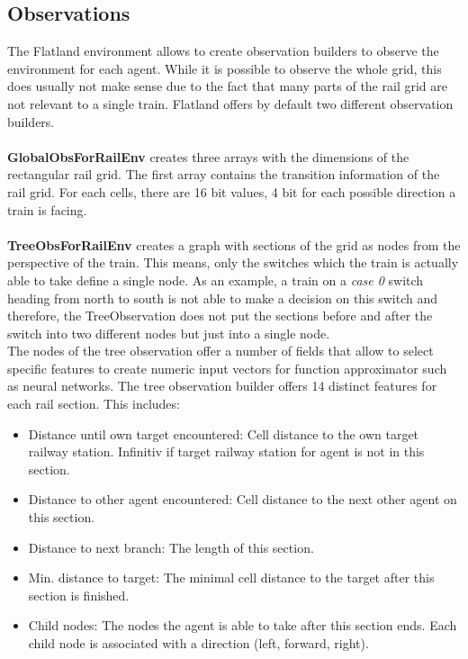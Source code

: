 \subsection*{Observations}\label{observations}
The Flatland environment allows to create observation builders to observe the environment for each agent. While it is possible to observe the whole grid, this does usually not make sense due to the fact that many parts of the rail grid are not relevant to a single train. Flatland offers by default two different observation builders.\\\\
\textbf{GlobalObsForRailEnv} creates three arrays with the dimensions of the rectangular rail grid. The first array contains the transition information of the rail grid. For each cells, there are 16 bit values, 4 bit for each possible direction a train is facing.\\\\
\textbf{TreeObsForRailEnv} creates a graph with sections of the grid as nodes from the perspective of the train.
This means, only the switches which the train is actually able to take define a single node. As an example, a train on a \textit{case 0} switch heading from north to south is not able to make a decision on this switch and therefore, the TreeObservation does not put the sections before and after the switch into two different nodes but just into a single node.\\
The nodes of the tree observation offer a number of fields that allow to select specific features to create numeric input vectors for function approximator such as neural networks. The tree observation builder offers 14 distinct features for each rail section. This includes:
\begin{itemize}
	\item Distance until own target encountered: Cell distance to the own target railway station. Infinitiv if target railway station for agent is not in this section.
	\item Distance to other agent encountered: Cell distance to the next other agent on this section.
	\item Distance to next branch: The length of this section.
	\item Min. distance to target: The minimal cell distance to the target after this section is finished.
	\item Child nodes: The nodes the agent is able to take after this section ends. Each child node is associated with a direction (left, forward, right).
\end{itemize}



